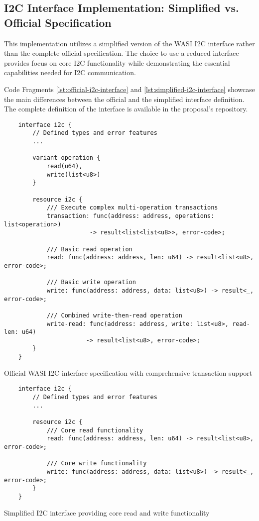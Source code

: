 \subsection{I2C Interface Implementation: Simplified vs. Official Specification}

This implementation utilizes a simplified version of the WASI I2C interface rather than the complete official specification. The choice to use a reduced interface provides focus on core I2C functionality while demonstrating the essential capabilities needed for I2C communication.

Code Fragments \ref{lst:official-i2c-interface} and \ref{lst:simplified-i2c-interface} showcase the main differences between the official and the simplified interface definition. The complete definition of the interface is available in the proposal's repository. %

\begin{listing}[H]
    \begin{verbatim}
    interface i2c {
        // Defined types and error features
        ... 
        
        variant operation {
            read(u64),
            write(list<u8>)
        }
    
        resource i2c {
            /// Execute complex multi-operation transactions
            transaction: func(address: address, operations: list<operation>) 
                        -> result<list<list<u8>>, error-code>;
            
            /// Basic read operation
            read: func(address: address, len: u64) -> result<list<u8>, error-code>;
            
            /// Basic write operation  
            write: func(address: address, data: list<u8>) -> result<_, error-code>;
            
            /// Combined write-then-read operation
            write-read: func(address: address, write: list<u8>, read-len: u64) 
                       -> result<list<u8>, error-code>;
        }
    }
    \end{verbatim}
    \caption{Official WASI I2C interface specification with comprehensive transaction support}
    \label{lst:official-i2c-interface}
\end{listing}

\begin{listing}[H]
    \begin{verbatim}
    interface i2c {
        // Defined types and error features
        ... 
    
        resource i2c {
            /// Core read functionality
            read: func(address: address, len: u64) -> result<list<u8>, error-code>;
            
            /// Core write functionality
            write: func(address: address, data: list<u8>) -> result<_, error-code>;
        }
    }
    \end{verbatim}
    \caption{Simplified I2C interface providing core read and write functionality}
    \label{lst:simplified-i2c-interface}
\end{listing}

